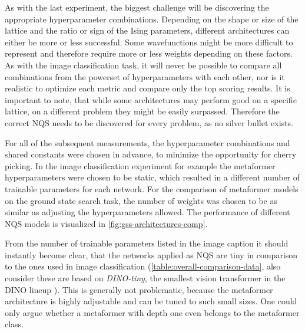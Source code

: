 As with the last experiment, the biggest challenge will be discovering the appropriate hyperparameter combinations.
Depending on the shape or size of the lattice and the ratio or sign of the Ising parameters, different architectures can either be more or less successful.
Some wavefunctions might be more difficult to represent and therefore require more or less weights depending on these factors.
As with the image classification task, it will never be possible to compare all combinations from the powerset of hyperparameters with each other, nor is it realistic to optimize each metric and compare only the top scoring results.
It is important to note, that while some architectures may perform good on a specific lattice, on a different problem they might be easily surpassed. 
Therefore the correct NQS needs to be discovered for every problem, as no \glqq silver bullet\grqq{} exists.

For all of the subsequent measurements, the hyperparameter combinations and shared constants were chosen in advance, to minimize the opportunity for cherry picking.
In the image classification experiment for example the metaformer hyperparameters were chosen to be static, which resulted in a different number of trainable parameters for each network.
For the comparison of metaformer models on the ground state search task, the number of weights was chosen to be as similar as adjusting the hyperparameters allowed. 
The performance of different NQS models is visualized in \autoref{fig:gss-architectures-comp}.

From the number of trainable parameters listed in the image caption it should instantly become clear, that the networks applied as NQS are tiny in comparison to the ones used in image classification (\autoref{table:overall-comparison-data}, also consider these are based on \emph{DINO-tiny}, the smallest vision transformer in the DINO lineup \cite{dinoGithub}).
This is generally not problematic, because the metaformer architecture is highly adjustable and can be tuned to such small sizes. One could only argue whether a metaformer with depth one even belongs to the metaformer class.

